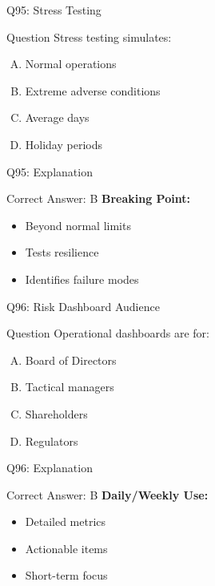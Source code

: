 \documentclass{beamer}
\begin{document}
			\begin{frame}{Q95: Stress Testing}
				\begin{block}{Question}
					Stress testing simulates:
				\end{block}
				\begin{enumerate}[(A)]
					\item Normal operations
					\item Extreme adverse conditions
					\item Average days
					\item Holiday periods
				\end{enumerate}
			\end{frame}
			\begin{frame}{Q95: Explanation}
				\begin{block}{Correct Answer: B}
					\textbf{Breaking Point:}
					\begin{itemize}
						\item Beyond normal limits
						\item Tests resilience
						\item Identifies failure modes
					\end{itemize}
				\end{block}
			\end{frame}
			
			\begin{frame}{Q96: Risk Dashboard Audience}
				\begin{block}{Question}
					Operational dashboards are for:
				\end{block}
				\begin{enumerate}[(A)]
					\item Board of Directors
					\item Tactical managers
					\item Shareholders
					\item Regulators
				\end{enumerate}
			\end{frame}
			\begin{frame}{Q96: Explanation}
				\begin{block}{Correct Answer: B}
					\textbf{Daily/Weekly Use:}
					\begin{itemize}
						\item Detailed metrics
						\item Actionable items
						\item Short-term focus
					\end{itemize}
				\end{block}
			\end{frame}
			
\end{document}
